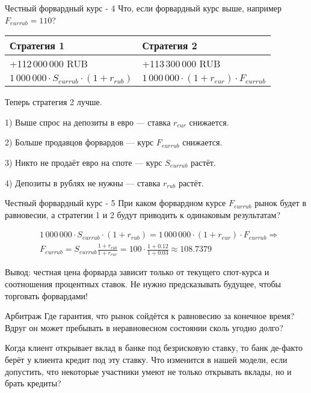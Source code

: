 \documentclass{beamer}
\begin{document}
\begin{frame}{Честный форвардный курс - 4}
\justify
Что, если форвардный курс выше, например $F_{eurrub}=110$?


\justify
\centering
\begin{tabular}{l|l}
Стратегия 1 & Стратегия 2 \\ \hline
+112\,000\,000 RUB  & +113\,300\,000 RUB \\
$1\,000\,000 \cdot S_{eurrub} \cdot (1+r_{rub})$ & $1\,000\,000 \cdot (1+r_{eur}) \cdot F_{eurrub}$
\end{tabular}

\justify
Теперь стратегия 2 лучше. 

1) Выше спрос на депозиты в евро --- ставка $r_{eur}$ снижается.

2) Больше продавцов форвардов --- курс $F_{eurrub}$ снижается.

3) Никто не продаёт евро на споте --- курс $S_{eurrub}$ растёт. 

4) Депозиты в рублях не нужны --- ставка $r_{rub}$ растёт.
\end{frame}



\begin{frame}{Честный форвардный курс - 5}
\justify
При каком форвардном курсе $F_{eurrub}$ рынок будет в равновесии, а стратегии 1 и 2 будут приводить к одинаковым результатам?

\begin{align*}
&1\,000\,000 \cdot S_{eurrub} \cdot (1 + r_{rub}) = 1\,000\,000 \cdot (1+r_{eur}) \cdot F_{eurrub} \Rightarrow \\
&F_{eurrub} = S_{eurrub} \frac{1 + r_{rub}}{1 + r_{eur}} = 100 \cdot \frac{1 + 0.12}{1 + 0.03} \approx 108.7379
\end{align*}

\justify
Вывод: честная цена форварда зависит только от текущего спот-курса и соотношения процентных ставок. Не нужно предсказывать будущее, чтобы торговать форвардами!
\end{frame}



\begin{frame}{Арбитраж}
\justify
Где гарантия, что рынок сойдётся к равновесию за конечное время? Вдруг он может пребывать в неравновесном состоянии сколь угодно долго?

\justify
Когда клиент открывает вклад в банке под безрисковую ставку, то банк де-факто берёт у клиента кредит под эту ставку. Что изменится в нашей модели, если допустить, что некоторые участники умеют не только открывать вклады, но и брать кредиты?
\end{frame}
\end{document}

